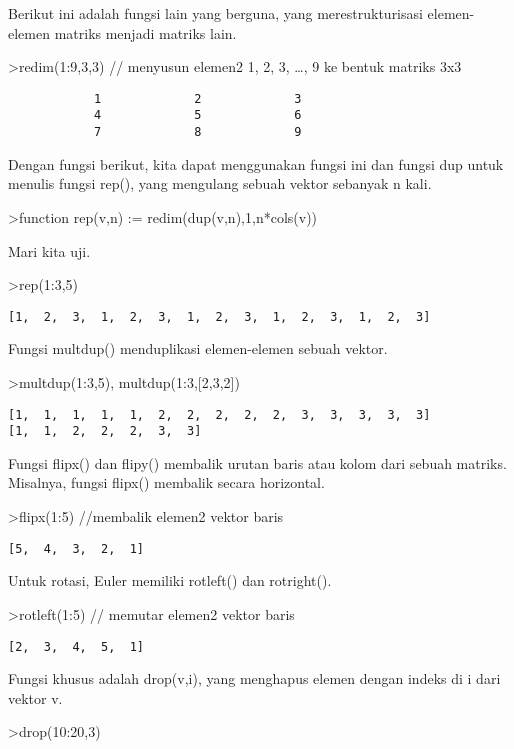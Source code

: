 \documentclass[
]{book}
\begin{document}
Berikut ini adalah fungsi lain yang berguna, yang merestrukturisasi elemen-elemen matriks menjadi matriks lain.

\textgreater redim(1:9,3,3) // menyusun elemen2 1, 2, 3, \ldots, 9 ke bentuk matriks 3x3

\begin{verbatim}
            1             2             3 
            4             5             6 
            7             8             9 
\end{verbatim}

Dengan fungsi berikut, kita dapat menggunakan fungsi ini dan fungsi dup untuk menulis fungsi rep(), yang mengulang sebuah vektor sebanyak n kali.

\textgreater function rep(v,n) := redim(dup(v,n),1,n*cols(v))

Mari kita uji.

\textgreater rep(1:3,5)

\begin{verbatim}
[1,  2,  3,  1,  2,  3,  1,  2,  3,  1,  2,  3,  1,  2,  3]
\end{verbatim}

Fungsi multdup() menduplikasi elemen-elemen sebuah vektor.

\textgreater multdup(1:3,5), multdup(1:3,{[}2,3,2{]})

\begin{verbatim}
[1,  1,  1,  1,  1,  2,  2,  2,  2,  2,  3,  3,  3,  3,  3]
[1,  1,  2,  2,  2,  3,  3]
\end{verbatim}

Fungsi flipx() dan flipy() membalik urutan baris atau kolom dari sebuah matriks. Misalnya, fungsi flipx() membalik secara horizontal.

\textgreater flipx(1:5) //membalik elemen2 vektor baris

\begin{verbatim}
[5,  4,  3,  2,  1]
\end{verbatim}

Untuk rotasi, Euler memiliki rotleft() dan rotright().

\textgreater rotleft(1:5) // memutar elemen2 vektor baris

\begin{verbatim}
[2,  3,  4,  5,  1]
\end{verbatim}

Fungsi khusus adalah drop(v,i), yang menghapus elemen dengan indeks di i dari vektor v.

\textgreater drop(10:20,3)
\end{document}
